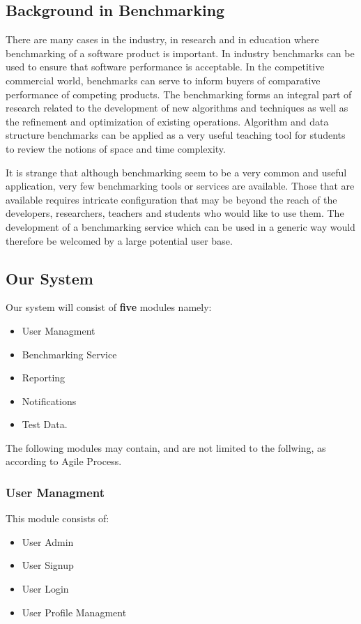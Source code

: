 \subsection{Background in Benchmarking}
There are many cases in the industry, in research and in education where benchmarking of
a software product is important. In industry benchmarks can be used to ensure that software
performance is acceptable. In the competitive commercial world, benchmarks can serve to inform
buyers of comparative performance of competing products. The benchmarking forms an integral
part of research related to the development of new algorithms and techniques as well as the refinement
and optimization of existing operations. Algorithm and data structure benchmarks can be applied
as a very useful teaching tool for students to review the notions of space and time complexity.

It is strange that although benchmarking seem to be a very common and useful application, very few benchmarking tools or services are available. Those that are available requires intricate configuration that may be beyond the reach of the developers, researchers,
teachers and students who would like to use them. The development of a benchmarking service which can be used in a generic way would therefore be welcomed by a large
potential user base.

\subsection{Our System}
Our system will consist of \textbf{five} modules namely:
\begin{itemize}
	\item User Managment 
	\item Benchmarking Service
	\item Reporting
	\item Notifications 
	\item Test Data.
\end{itemize}
The following modules may contain, and are not limited to the follwing, as according to Agile Process.

\subsubsection{User Managment}
This module consists of:
\begin{itemize}
  \item User Admin
  \item User Signup
  \item User Login
  \item User Profile Managment
\end{itemize}

